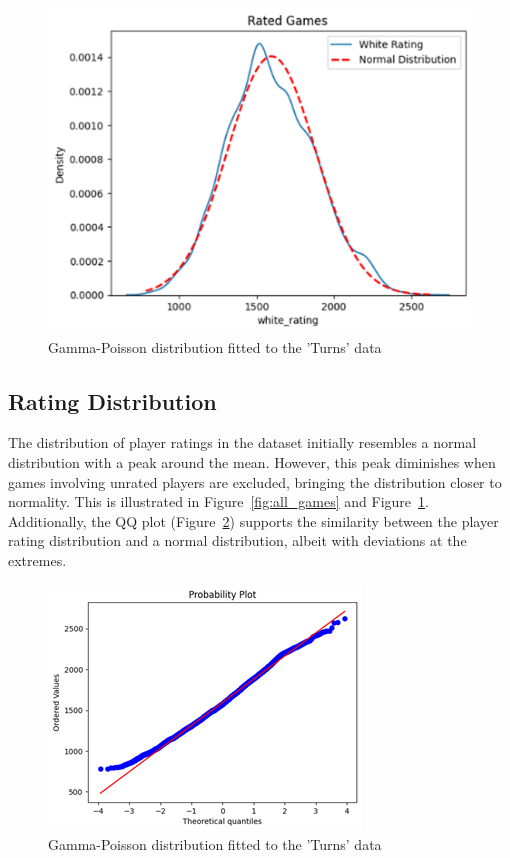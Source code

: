 \documentclass[conference]{IEEEtran}
\begin{document}
\begin{figure}[H]
    \centering
    \includegraphics[width=0.8\linewidth]{ratedgames.png}
    \caption{Gamma-Poisson distribution fitted to the 'Turns' data}
    \label{fig:rated_games}
\end{figure}

\subsection{Rating Distribution}
The distribution of player ratings in the dataset initially resembles a normal distribution with a peak around the mean. However, this peak diminishes when games involving unrated players are excluded, bringing the distribution closer to normality. This is illustrated in Figure~\ref{fig:all_games} and Figure~\ref{fig:rated_games}. Additionally, the QQ plot (Figure~\ref{fig:rating_qq}) supports the similarity between the player rating distribution and a normal distribution, albeit with deviations at the extremes.

\begin{figure}[H]
    \centering
    \includegraphics[width=0.8\linewidth]{ratingqq.png}
    \caption{Gamma-Poisson distribution fitted to the 'Turns' data}
    \label{fig:rating_qq}
\end{figure}
\end{document}
